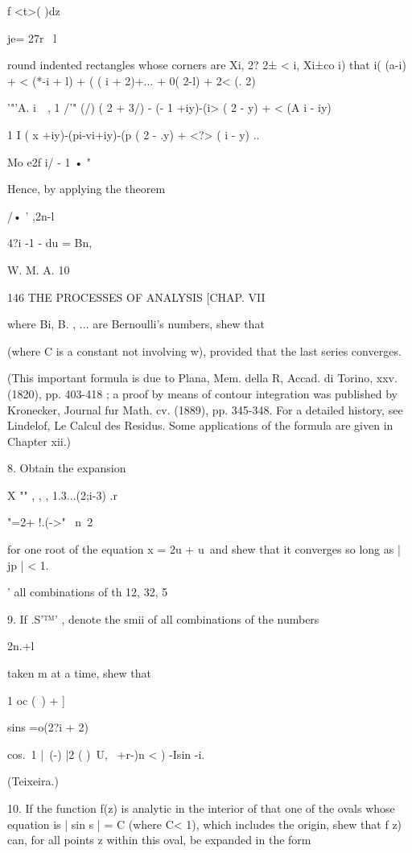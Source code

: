 {{f <t>( )dz

je= 27r \ l

round indented rectangles whose corners are Xi, 2? 2± < i, Xi±co i)
that i( (a-i) + < (*-i + l) + ( ( i + 2)+... + 0( 2-l) + 2< (. 2)

'"'A. i~\ , 1 /'" (/) ( 2 + 3/) - (- 1 +iy)-(i> ( 2 - y) + < (A i -
iy)

1 I ( x +iy)-(pi-vi+iy)-(p ( 2 - .y) + <?> ( i - y) ..

Mo e2f i/ - 1 • "

Hence, by applying the theorem

/• ' ,2n-l

4?i -1 - du = Bn,

W. M. A. 10

146 THE PROCESSES OF ANALYSIS [CHAP. VII

where Bi, B. , ... are Bernoulli's numbers, shew that

(where C is a constant not involving w), provided that the last series
converges.

(This important formula is due to Plana, Mem. della R, Accad. di
Torino, xxv. (1820), pp. 403-418 ; a proof by means of contour
integration was published by Kronecker, Journal fur Math. cv. (1889),
pp. 345-348. For a detailed history, see Lindelof, Le Calcul des
Residus. Some applications of the formula are given in Chapter xii.)

8. Obtain the expansion

X "" , , , 1.3...(2;i-3) .r

"=2+ !.(->"~ n\ 2

for one root of the equation x = 2u + u\ and shew that it converges so
long as | jp | < 1.

' all combinations of th 12, 32, 5%

9. If .S'™' , denote the smii of all combinations of the numbers

2n.+l

taken m at a time, shew that

1 oc (\ ) + ]

sins =o(2?i + 2)

cos.\ 1 |\ (-) |2 ( )\ U, \ +r-)n < ) -Isin -i.

(Teixeira.)

10. If the function f(z) is analytic in the interior of that one of
the ovals whose equation is | sin s | = C (where C< 1), which includes
the origin, shew that f z) can, for all points z within this oval, be
expanded in the form

}}
